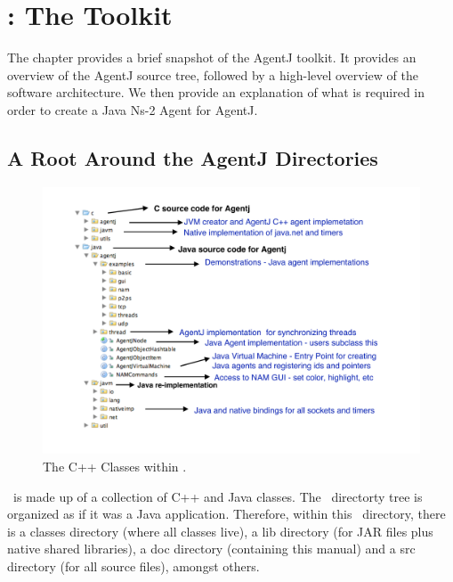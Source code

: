 \chapter{\agentj: The Toolkit}
\label{agentj}

The chapter provides a brief snapshot of the AgentJ toolkit. It provides an overview of the AgentJ source tree, followed by a high-level overview of the software architecture. We then provide an explanation of what is required in order to create a Java Ns-2 Agent for AgentJ.  


\section{A Root Around the AgentJ Directories}
\label{agentj:classes}


\begin{figure}
\centering
\includegraphics[scale=0.50]{images/directories}
\caption{The C++ Classes within \agentj.}
\label{fig:directories}
\end{figure}

\agentj~is made up of a collection of C++ and Java classes.  The \agentj~directorty 
tree is organized as if it was a Java application.  Therefore,
within this \agentj~directory, there is a classes directory (where all classes
live), a lib directory (for JAR files plus native shared libraries), a doc directory
(containing this manual) and a src directory (for all source files), amongst
others.


